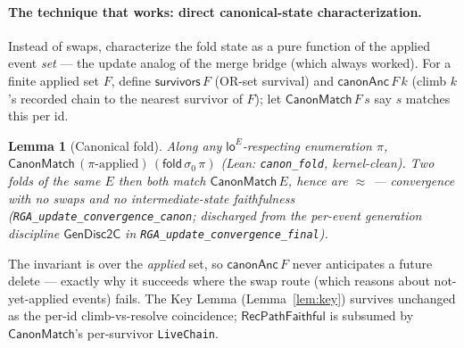 \documentclass[11pt]{article}
\newtheorem{lemma}[theorem]{Lemma}
\newcommand{\loE}[1]{\mathsf{lo}^{#1}}
\newcommand{\lean}[1]{\texttt{#1}}
\newcommand{\st}{\sigma}
\newcommand{\ini}{\st_0}
\newcommand{\eqobs}{\approx}
\newcommand{\fold}{\mathsf{fold}}
\newcommand{\RVF}{\textsf{RecPathFaithful}}
\begin{document}
\paragraph{The technique that works: direct canonical-state characterization.} Instead of swaps,
characterize the fold state as a pure function of the applied event \emph{set} --- the update
analog of the merge bridge (which always worked). For a finite applied set $F$, define
$\mathsf{survivors}\,F$ (OR-set survival) and $\mathsf{canonAnc}\,F\,k$ (climb $k$'s recorded chain
to the nearest survivor of $F$); let $\mathsf{CanonMatch}\,F\,s$ say $s$ matches this per id.
\begin{lemma}[Canonical fold]\label{lem:canon}
Along any $\loE{E}$-respecting enumeration $\pi$, $\mathsf{CanonMatch}\,(\pi\text{-applied})\,
(\fold\,\ini\,\pi)$ (Lean: \lean{canon\_fold}, kernel-clean). Two folds of the same $E$ then both
match $\mathsf{CanonMatch}\,E$, hence are $\eqobs$ --- convergence with no swaps and no
intermediate-state faithfulness (\lean{RGA\_update\_convergence\_canon}; discharged from the
per-event generation discipline $\mathsf{GenDisc2C}$ in \lean{RGA\_update\_convergence\_final}).
\end{lemma}
The invariant is over the \emph{applied} set, so $\mathsf{canonAnc}\,F$ never anticipates a future
delete --- exactly why it succeeds where the swap route (which reasons about not-yet-applied
events) fails. The Key Lemma (Lemma~\ref{lem:key}) survives unchanged as the per-id climb-vs-resolve
coincidence; $\RVF$ is subsumed by $\mathsf{CanonMatch}$'s per-survivor \lean{LiveChain}.
\end{document}
